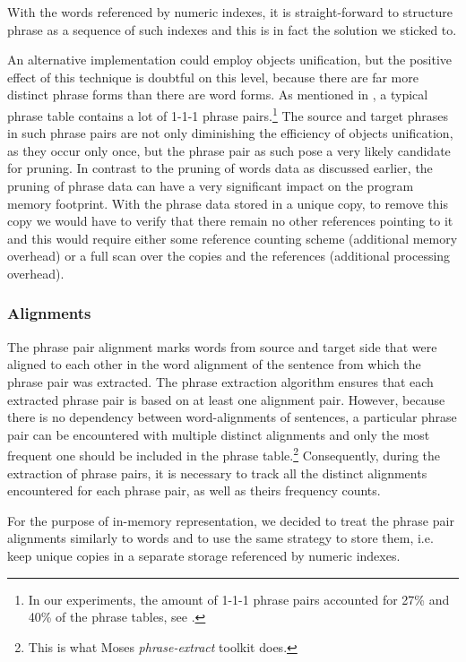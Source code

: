 With the words referenced by numeric indexes, it is straight-forward to structure phrase
as a sequence of such indexes and this is in fact the solution we sticked to.

An alternative implementation could employ objects unification, but the positive effect
of this technique is doubtful on this level, because there are far more distinct phrase
forms than there are word forms.
As mentioned in , a typical phrase table contains a lot
of 1-1-1 phrase pairs.\footnote{In our experiments, the amount of 1-1-1 phrase pairs
accounted for 27\% and 40\% of the phrase tables, see .}
The source and target phrases in such phrase pairs are not only diminishing the
efficiency of objects unification, as they occur only once, but the phrase pair as such
pose a very likely candidate for pruning.
In contrast to the pruning of words data as discussed earlier, the pruning of phrase
data can have a very significant impact on the program memory footprint.
With the phrase data stored in a unique copy, to remove this copy we would have to
verify that there remain no other references pointing to it and this would require
either some reference counting scheme (additional memory overhead) or a full scan over
the copies and the references (additional processing overhead).

\subsubsection*{Alignments}

The phrase pair alignment marks words from source and target side that were aligned to
each other in the word alignment of the sentence from which the phrase pair was extracted.
The phrase extraction algorithm ensures that each extracted phrase pair is based on
at least one alignment pair.
However, because there is no dependency between word-alignments of sentences,
a particular phrase pair can be encountered with multiple distinct alignments and only
the most frequent one should be included in the phrase table.\footnote{This is what Moses \emph{phrase-extract} toolkit does.}
Consequently, during the extraction of phrase pairs, it is necessary to track all the
distinct alignments encountered for each phrase pair, as well as theirs frequency counts.

For the purpose of in-memory representation, we decided to treat the phrase pair alignments
similarly to words and to use the same strategy to store them, i.e. keep unique copies in
a separate storage referenced by numeric indexes.


